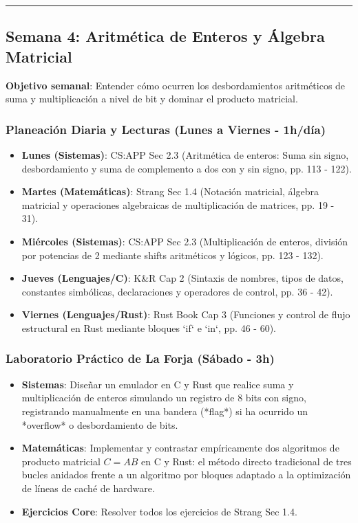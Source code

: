 \documentclass[11pt, a4paper]{article}
\begin{document}
\noindent\rule{\textwidth}{0.4pt}

\subsection{Semana 4: Aritmética de Enteros y Álgebra Matricial}
\textbf{Objetivo semanal}: Entender cómo ocurren los desbordamientos aritméticos de suma y multiplicación a nivel de bit y dominar el producto matricial.

\subsubsection{Planeación Diaria y Lecturas (Lunes a Viernes - 1h/día)}
\begin{itemize}
    \item \textbf{Lunes (Sistemas)}: CS:APP Sec 2.3 (Aritmética de enteros: Suma sin signo, desbordamiento y suma de complemento a dos con y sin signo, pp. 113 - 122).
    \item \textbf{Martes (Matemáticas)}: Strang Sec 1.4 (Notación matricial, álgebra matricial y operaciones algebraicas de multiplicación de matrices, pp. 19 - 31).
    \item \textbf{Miércoles (Sistemas)}: CS:APP Sec 2.3 (Multiplicación de enteros, división por potencias de 2 mediante shifts aritméticos y lógicos, pp. 123 - 132).
    \item \textbf{Jueves (Lenguajes/C)}: K\&R Cap 2 (Sintaxis de nombres, tipos de datos, constantes simbólicas, declaraciones y operadores de control, pp. 36 - 42).
    \item \textbf{Viernes (Lenguajes/Rust)}: Rust Book Cap 3 (Funciones y control de flujo estructural en Rust mediante bloques `if` e `in`, pp. 46 - 60).
\end{itemize}

\subsubsection{Laboratorio Práctico de La Forja (Sábado - 3h)}
\begin{itemize}
    \item \textbf{Sistemas}: Diseñar un emulador en C y Rust que realice suma y multiplicación de enteros simulando un registro de 8 bits con signo, registrando manualmente en una bandera (*flag*) si ha ocurrido un *overflow* o desbordamiento de bits.
    \item \textbf{Matemáticas}: Implementar y contrastar empíricamente dos algoritmos de producto matricial $C = AB$ en C y Rust: el método directo tradicional de tres bucles anidados frente a un algoritmo por bloques adaptado a la optimización de líneas de caché de hardware.
    \item \textbf{Ejercicios Core}: Resolver todos los ejercicios de Strang Sec 1.4.
\end{itemize}
\end{document}

